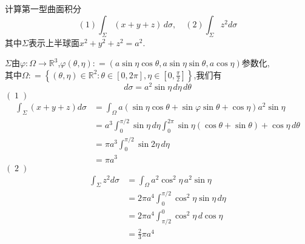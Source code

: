 \documentclass[lang=cn,12pt,color=green,fontset=none,thmcnt=section]{elegantbook}
\begin{document}
\chapter{}

\chapter{}



\chapter{}

\begin{exercise}[] 计算第一型曲面积分 $$ \operatorname{\left( 1 \right) } \int
_{\Sigma}\left( x+y+z \right) \,d\sigma,\quad \left( 2 \right) \int
_{\Sigma}z^{2}d\sigma $$其中$\Sigma$表示上半球面$x^{2}+y^{2}+z^{2}=a^{2}$.
\end{exercise}

\begin{solution}
    $\Sigma$由$\varphi :\Omega\to \mathbb{R}^{3}$,$\varphi \left( \theta,\eta
    \right): = \left( a\sin \eta\cos\theta ,a\sin\eta \sin\theta,a\cos
    \eta\right)$参数化,\\ 其中$\Omega: = \left\{ \left( \theta,\eta \right)\in
    \mathbb{R}^{2}:\theta \in[0,2\pi],\eta \in\left[ 0, \frac{\pi}{2} \right]
    \right\}$,我们有 $$ d\sigma = a^{2}\sin \eta\,d \eta\,d\theta $$ $\left(
    \operatorname{1} \right)$ $$ \begin{aligned} \int _{\Sigma}\left( x+y+z
    \right) d\sigma & = \int _{\Omega} a\left( \sin \eta\cos\theta +\sin \varphi
    \sin\theta +\cos \eta \right) a^{2}\sin \eta\\ & = a^{3}\int
    _{0}^{\pi/2}\sin \eta\,d \eta\int _{0}^{ 2\pi }\sin \eta \left( \cos\theta
    +\sin\theta \right)+\cos \eta\,d\theta \\ & = \pi a^{3}\int _{0}^{ \pi /2}
    \sin 2\eta\,d \eta \\ & =\pi a^{3} \end{aligned} $$ $\left( \operatorname{2}
    \right)$ $$ \begin{aligned} \int _{\Sigma}z^{2}d\sigma & = \int
    _{\Omega}a^{2}\cos ^{2}\eta\,a^{2}\sin\eta \\ & =2\pi a^{4}\int _{0}^{
    \pi/2} \cos ^{2}\eta \sin \eta\,d \eta \\ & = 2\pi a^{4}\int _{\pi/2}^{
    0}\cos ^{2}\eta \,d\cos \eta \\ & = \frac{2}{3}\pi a^{4}\end{aligned} $$
\end{solution}
\end{document}

